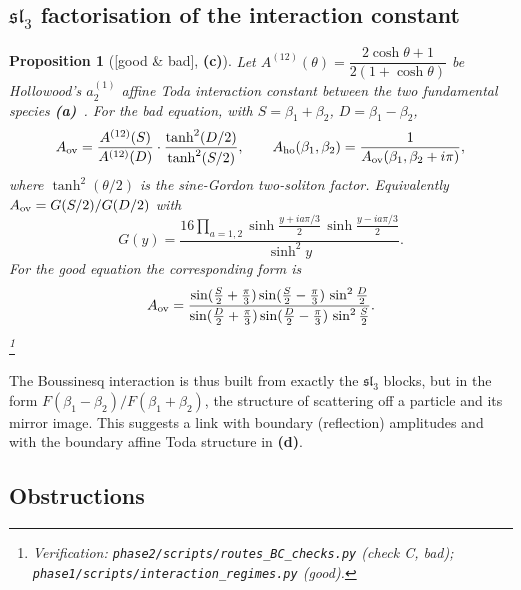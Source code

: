 \documentclass[11pt,a4paper]{article}
\newcommand{\lab}[1]{{\normalfont\sffamily\footnotesize\bfseries(#1)}}
\newcommand{\La}{\lab{a}}
\newcommand{\Lc}{\lab{c}}
\newcommand{\Ld}{\lab{d}}
\newcommand{\eqtag}[2]{{\normalfont\sffamily\footnotesize\textcolor{#1}{[#2]}}}
\newcommand{\Both}{\eqtag{violet!70!black}{good \& bad}}
\newcommand{\scr}[1]{\nolinkurl{#1}}
\newcommand{\chk}[1]{\footnote{\raggedright Verification: #1.}}
\newtheorem{proposition}{Proposition}[section]
\theoremstyle{remark}
\begin{document}
\subsection{\texorpdfstring{$\mathfrak{sl}_3$}{sl3} factorisation of the interaction constant}

\begin{proposition}[\Both, \Lc]\label{prop:fact}
Let $A^{(12)}(\theta)=\dfrac{2\cosh\theta+1}{2(1+\cosh\theta)}$ be Hollowood's $a_2^{(1)}$ affine Toda interaction constant between the two fundamental species \La~\cite[(1.19)]{Hol92}. For the bad equation, with $S=\beta_1+\beta_2$, $D=\beta_1-\beta_2$,
\begin{equation}\label{eq:fact}
A_{\rm ov}=\frac{A^{(12)}(S)}{A^{(12)}(D)}\cdot\frac{\tanh^2(D/2)}{\tanh^2(S/2)},\qquad A_{\rm ho}(\beta_1,\beta_2)=\frac1{A_{\rm ov}(\beta_1,\beta_2+i\pi)},
\end{equation}
where $\tanh^2(\theta/2)$ is the sine-Gordon two-soliton factor. Equivalently $A_{\rm ov}=G(S/2)/G(D/2)$ with
\[
G(y)=\frac{16\prod_{a=1,2}\sinh\frac{y+ia\pi/3}{2}\,\sinh\frac{y-ia\pi/3}{2}}{\sinh^2y}.
\]
For the good equation the corresponding form is
\[
A_{\rm ov}=\frac{\sin(\frac S2+\frac\pi3)\sin(\frac S2-\frac\pi3)\,\sin^2\frac D2}{\sin(\frac D2+\frac\pi3)\sin(\frac D2-\frac\pi3)\,\sin^2\frac S2}.
\]
\chk{\scr{phase2/scripts/routes_BC_checks.py} (check C, bad); \scr{phase1/scripts/interaction_regimes.py} (good)}
\end{proposition}

The Boussinesq interaction is thus built from exactly the $\mathfrak{sl}_3$ blocks, but in the form $F(\beta_1-\beta_2)/F(\beta_1+\beta_2)$, the structure of scattering off a particle and its mirror image. This suggests a link with boundary (reflection) amplitudes and with the boundary affine Toda structure in \cite{BHK} \Ld.

\subsection{Obstructions}
\end{document}

